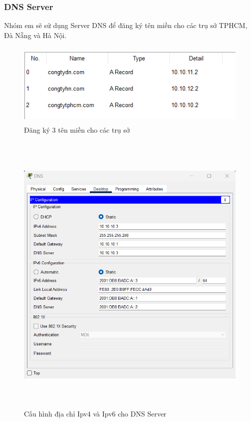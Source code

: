 \documentclass[12pt,a4paper]{report}
\begin{document}
\subsubsection{DNS Server}
\hspace*{0.25cm}Nhóm em sẽ sử dụng Server DNS để đăng ký tên miền cho các trụ sở TPHCM, Đà Nẵng và Hà Nội.\\
\begin{figure}[H]
    \centering
    \includegraphics[width=16cm, height=4cm]{img/DNS_Service1.png}
    \caption{Đăng ký 3 tên miền cho các trụ sở}
    \label{hinh441a}
\end{figure}
\begin{figure}[H]
    \centering
    \includegraphics[width=17cm, height=14cm]{img/DNS_Service2.png}
    \caption{Cấu hình địa chỉ Ipv4 và Ipv6 cho DNS Server}
    \label{hinh441b}
\end{figure}
\end{document}
